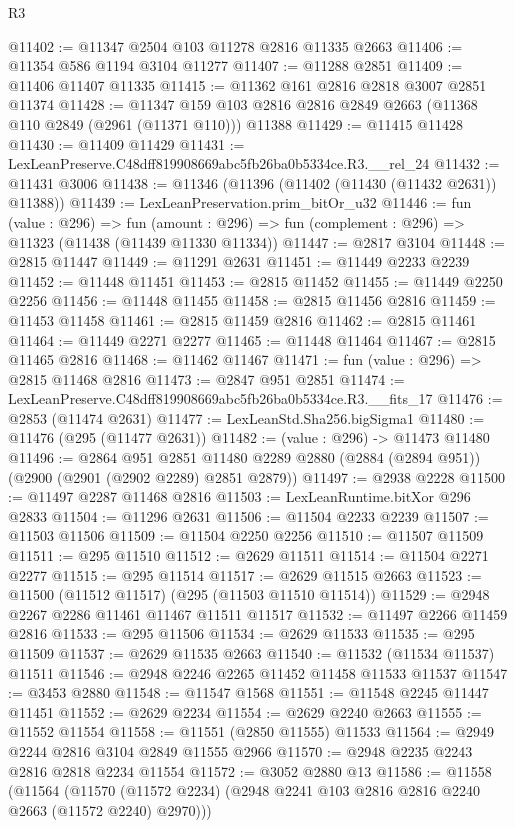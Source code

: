\begin{lexlean}{R3}
\begin{coremodule}
@11402 := @11347 @2504 @103 @11278 @2816 @11335 @2663
@11406 := @11354 @586 @1194 @3104 @11277
@11407 := @11288 @2851
@11409 := @11406 @11407 @11335
@11415 := @11362 @161 @2816 @2818 @3007 @2851 @11374
@11428 := @11347 @159 @103 @2816 @2816 @2849 @2663 (@11368 @110 @2849 (@2961 (@11371 @110))) @11388
@11429 := @11415 @11428
@11430 := @11409 @11429
@11431 := LexLeanPreserve.C48dff819908669abc5fb26ba0b5334ce.R3.__rel_24
@11432 := @11431 @3006
@11438 := @11346 (@11396 (@11402 (@11430 (@11432 @2631)) @11388))
@11439 := LexLeanPreservation.prim_bitOr_u32
@11446 := fun (value : @296) =>
  fun (amount : @296) => fun (complement : @296) => @11323 (@11438 (@11439 @11330 @11334))
@11447 := @2817 @3104
@11448 := @2815 @11447
@11449 := @11291 @2631
@11451 := @11449 @2233 @2239
@11452 := @11448 @11451
@11453 := @2815 @11452
@11455 := @11449 @2250 @2256
@11456 := @11448 @11455
@11458 := @2815 @11456 @2816
@11459 := @11453 @11458
@11461 := @2815 @11459 @2816
@11462 := @2815 @11461
@11464 := @11449 @2271 @2277
@11465 := @11448 @11464
@11467 := @2815 @11465 @2816
@11468 := @11462 @11467
@11471 := fun (value : @296) => @2815 @11468 @2816
@11473 := @2847 @951 @2851
@11474 := LexLeanPreserve.C48dff819908669abc5fb26ba0b5334ce.R3.__fits_17
@11476 := @2853 (@11474 @2631)
@11477 := LexLeanStd.Sha256.bigSigma1
@11480 := @11476 (@295 (@11477 @2631))
@11482 := (value : @296) -> @11473 @11480
@11496 := @2864
    @951
    @2851
    @11480
    @2289
    @2880
    (@2884 (@2894 @951))
    (@2900 (@2901 (@2902 @2289) @2851 @2879))
@11497 := @2938 @2228
@11500 := @11497 @2287 @11468 @2816
@11503 := LexLeanRuntime.bitXor @296 @2833
@11504 := @11296 @2631
@11506 := @11504 @2233 @2239
@11507 := @11503 @11506
@11509 := @11504 @2250 @2256
@11510 := @11507 @11509
@11511 := @295 @11510
@11512 := @2629 @11511
@11514 := @11504 @2271 @2277
@11515 := @295 @11514
@11517 := @2629 @11515 @2663
@11523 := @11500 (@11512 @11517) (@295 (@11503 @11510 @11514))
@11529 := @2948 @2267 @2286 @11461 @11467 @11511 @11517
@11532 := @11497 @2266 @11459 @2816
@11533 := @295 @11506
@11534 := @2629 @11533
@11535 := @295 @11509
@11537 := @2629 @11535 @2663
@11540 := @11532 (@11534 @11537) @11511
@11546 := @2948 @2246 @2265 @11452 @11458 @11533 @11537
@11547 := @3453 @2880
@11548 := @11547 @1568
@11551 := @11548 @2245 @11447 @11451
@11552 := @2629 @2234
@11554 := @2629 @2240 @2663
@11555 := @11552 @11554
@11558 := @11551 (@2850 @11555) @11533
@11564 := @2949 @2244 @2816 @3104 @2849 @11555 @2966
@11570 := @2948 @2235 @2243 @2816 @2818 @2234 @11554
@11572 := @3052 @2880 @13
@11586 := @11558
    (@11564 (@11570 (@11572 @2234) (@2948 @2241 @103 @2816 @2816 @2240 @2663 (@11572 @2240) @2970)))

\end{coremodule}
\end{lexlean}
